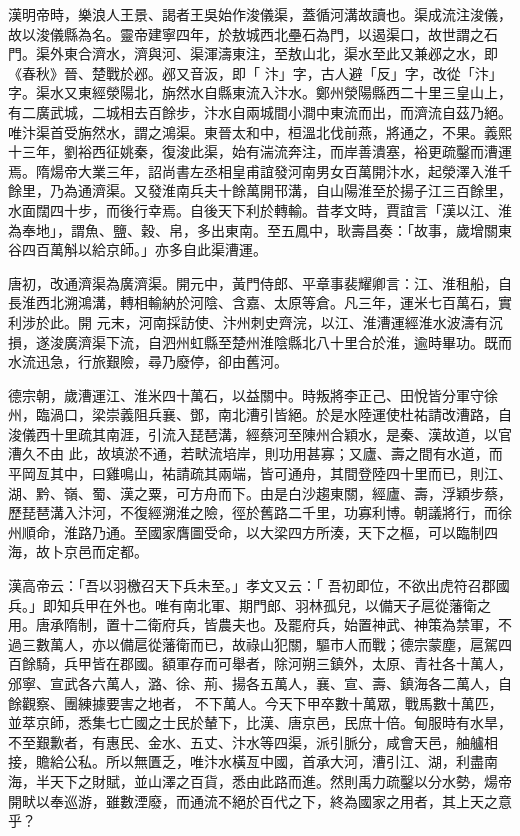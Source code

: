 \begin{pinyinscope}
 漢明帝時，樂浪人王景、謁者王吳始作浚儀渠，蓋循河溝故讀也。渠成流注浚儀，故以浚儀縣為名。靈帝建寧四年，於敖城西北壘石為門，以遏渠口，故世謂之石門。渠外東合濟水，濟與河、渠渾濤東注，至敖山北，渠水至此又兼邲之水，即《春秋》晉、楚戰於邲。邲又音汳，即「
 汴」字，古人避「反」字，改從「汴」字。渠水又東經滎陽北，旃然水自縣東流入汴水。鄭州滎陽縣西二十里三皇山上，有二廣武城，二城相去百餘步，汴水自兩城間小澗中東流而出，而濟流自茲乃絕。唯汴渠首受旃然水，謂之鴻渠。東晉太和中，桓溫北伐前燕，將通之，不果。義熙十三年，劉裕西征姚秦，復浚此渠，始有湍流奔注，而岸善潰塞，裕更疏鑿而漕運焉。隋煬帝大業三年，詔尚書左丞相皇甫誼發河南男女百萬開汴水，起滎澤入淮千
 餘里，乃為通濟渠。又發淮南兵夫十餘萬開邗溝，自山陽淮至於揚子江三百餘里，水面闊四十步，而後行幸焉。自後天下利於轉輸。昔孝文時，賈誼言「漢以江、淮為奉地」，謂魚、鹽、穀、帛，多出東南。至五鳳中，耿壽昌奏：「故事，歲增關東谷四百萬斛以給京師。」亦多自此渠漕運。



 唐初，改通濟渠為廣濟渠。開元中，黃門侍郎、平章事裴耀卿言：江、淮租船，自長淮西北溯鴻溝，轉相輸納於河陰、含嘉、太原等倉。凡三年，運米七百萬石，實利涉於此。開
 元末，河南採訪使、汴州刺史齊浣，以江、淮漕運經淮水波濤有沉損，遂浚廣濟渠下流，自泗州虹縣至楚州淮陰縣北八十里合於淮，逾時畢功。既而水流迅急，行旅艱險，尋乃廢停，卻由舊河。



 德宗朝，歲漕運江、淮米四十萬石，以益關中。時叛將李正己、田悅皆分軍守徐州，臨渦口，梁崇義阻兵襄、鄧，南北漕引皆絕。於是水陸運使杜祐請改漕路，自浚儀西十里疏其南涯，引流入琵琶溝，經蔡河至陳州合穎水，是秦、漢故道，以官漕久不由
 此，故填淤不通，若畎流培岸，則功用甚寡；又廬、壽之間有水道，而平岡亙其中，曰雞鳴山，祐請疏其兩端，皆可通舟，其間登陸四十里而已，則江、湖、黔、嶺、蜀、漢之粟，可方舟而下。由是白沙趨東關，經廬、壽，浮穎步蔡，歷琵琶溝入汴河，不復經溯淮之險，徑於舊路二千里，功寡利博。朝議將行，而徐州順命，淮路乃通。至國家膺圖受命，以大梁四方所湊，天下之樞，可以臨制四海，故卜京邑而定都。



 漢高帝云：「吾以羽檄召天下兵未至。」孝文又云：「
 吾初即位，不欲出虎符召郡國兵。」即知兵甲在外也。唯有南北軍、期門郎、羽林孤兒，以備天子扈從藩衛之用。唐承隋制，置十二衛府兵，皆農夫也。及罷府兵，始置神武、神策為禁軍，不過三數萬人，亦以備扈從藩衛而已，故祿山犯關，驅市人而戰；德宗蒙塵，扈駕四百餘騎，兵甲皆在郡國。額軍存而可舉者，除河朔三鎮外，太原、青社各十萬人，邠寧、宣武各六萬人，潞、徐、荊、揚各五萬人，襄、宣、壽、鎮海各二萬人，自餘觀察、團練據要害之地者，
 不下萬人。今天下甲卒數十萬眾，戰馬數十萬匹，並萃京師，悉集七亡國之士民於輦下，比漢、唐京邑，民庶十倍。甸服時有水旱，不至艱歉者，有惠民、金水、五丈、汴水等四渠，派引脈分，咸會天邑，舳艫相接，贍給公私。所以無匱乏，唯汴水橫亙中國，首承大河，漕引江、湖，利盡南海，半天下之財賦，並山澤之百貨，悉由此路而進。然則禹力疏鑿以分水勢，煬帝開畎以奉巡游，雖數湮廢，而通流不絕於百代之下，終為國家之用者，其上天之意
 乎？




\end{pinyinscope}
